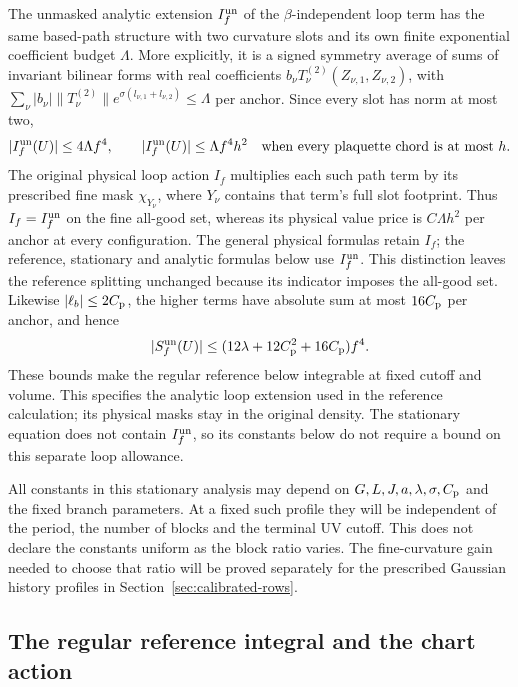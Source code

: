 \documentclass[11pt,reqno]{amsart}
\numberwithin{equation}{section}
\theoremstyle{definition}
\theoremstyle{remark}
\begin{document}
The unmasked analytic extension \(I_f^{\rm un}\) of the
\(\beta\)-independent loop term has the same based-path
structure with two curvature slots and its own finite exponential
coefficient budget \(\Lambda\). More explicitly, it is a signed
symmetry average of sums of invariant bilinear forms with real coefficients
\(b_\nu T_\nu^{(2)}(Z_{\nu,1},Z_{\nu,2})\), with
\(\sum_\nu|b_\nu|\|T_\nu^{(2)}\|e^{\sigma(l_{\nu,1}+l_{\nu,2})}
\le\Lambda\) per anchor. Since every slot has norm at most two,
\[
       |I_f^{\rm un}(U)|\le4\Lambda f^4,
       \qquad
       |I_f^{\rm un}(U)|\le\Lambda f^4h^2
              \quad\text{when every plaquette chord is at most }h.
\]
The original physical loop action \(I_f\) multiplies each such
path term by its prescribed fine mask \(\chi_{Y_\nu}\), where
\(Y_\nu\) contains that term's full slot footprint. Thus
\(I_f=I_f^{\rm un}\) on the fine all-good set, whereas its
physical value price is \(C\Lambda h^2\) per anchor at every
configuration. The general physical formulas retain \(I_f\);
the reference, stationary and analytic formulas below use
\(I_f^{\rm un}\). This distinction leaves the reference splitting
unchanged because its indicator imposes the all-good set.
Likewise \(|\ell_b|\le2C_{\rm p}\), the higher terms have
absolute sum at most \(16C_{\rm p}\) per anchor, and hence
\[
       |S_f^{\rm un}(U)|
          \le(12\lambda+12C_{\rm p}^2+16C_{\rm p})f^4.
\]
These bounds make the regular reference below integrable at fixed
cutoff and volume. This specifies the analytic loop extension
used in the reference calculation; its physical masks stay in
the original density. The stationary
equation does not contain \(I_f^{\rm un}\), so its constants below do not
require a bound on this separate loop allowance.

All constants in this stationary analysis may depend on
\(G,L,J,a,\lambda,\sigma,C_{\rm p}\) and the fixed branch parameters.
At a fixed such profile they will be independent of the period,
the number of blocks and the terminal UV cutoff. This does not
declare the constants uniform as the block ratio varies.
The fine-curvature gain needed to choose that ratio will be
proved separately for the prescribed Gaussian history profiles
in Section~\ref{sec:calibrated-rows}.

\subsection{The regular reference integral and the chart action}
\end{document}
